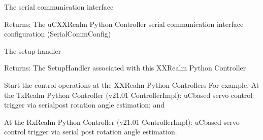 \documentclass[letterpaper,10pt,english]{sphinxmanual}
\begin{document}
\begin{fulllineitems}
\begin{fulllineitems}
\end{fulllineitems}


\begin{fulllineitems}
\label{\detokenize{Forge:Forge.Controller.serial_comm}}
\sphinxAtStartPar
The serial communication interface

\sphinxAtStartPar
Returns: The uC\sphinxhyphen{}XXRealm Python Controller serial communication interface configuration (SerialCommConfig)

\end{fulllineitems}


\begin{fulllineitems}
\label{\detokenize{Forge:Forge.Controller.setup_handler}}
\sphinxAtStartPar
The setup handler

\sphinxAtStartPar
Returns: The SetupHandler associated with this XXRealm Python Controller

\end{fulllineitems}


\begin{fulllineitems}
\label{\detokenize{Forge:Forge.Controller.start}}
\sphinxAtStartPar
Start the control operations at the XXRealm Python Controllers
For example, At the TxRealm Python Controller (v21.01 ControllerImpl): uC\sphinxhyphen{}based servo control trigger via
serial\textendash{}post rotation angle estimation; and

\sphinxAtStartPar
At the RxRealm Python Controller (v21.01 ControllerImpl): uC\sphinxhyphen{}based servo control trigger via serial\textendash{}
post rotation angle estimation.

\end{fulllineitems}



\end{fulllineitems}
\end{document}
